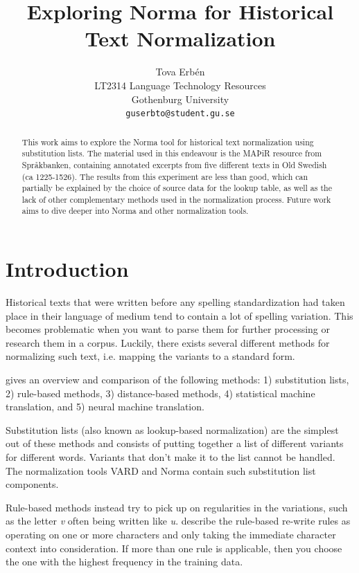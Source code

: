 \documentclass[11pt,a4paper]{article}
\title{Exploring Norma for Historical Text Normalization}
\author{Tova Erbén  \\
  LT2314 Language Technology Resources \\
  Gothenburg University \\
  \texttt{guserbto@student.gu.se} }
\date{}
\begin{document}
\maketitle
\begin{abstract}
This work aims to explore the Norma tool \cite{bollmann:12} for historical text normalization using substitution lists. The material used in this endeavour is the MAÞiR resource from Språkbanken, containing annotated excerpts from five different texts in Old Swedish (ca 1225-1526). The results from this experiment are less than good, which can partially be explained by the choice of source data for the lookup table, as well as the lack of other complementary methods used in the normalization process. Future work aims to dive deeper into Norma and other normalization tools.
\end{abstract}

\section{Introduction}

Historical texts that were written before any spelling standardization had taken place in their language of medium tend to contain a lot of spelling variation. This becomes problematic when you want to parse them for further processing or research them in a corpus. Luckily, there exists several different methods for normalizing such text, i.e. mapping the variants to a standard form.

\citet{bollmann:19} gives an overview and comparison of the following methods: 1) substitution lists, 2) rule-based methods, 3) distance-based methods, 4) statistical machine translation, and 5) neural machine translation. 

Substitution lists (also known as lookup-based normalization) are the simplest out of these methods and consists of putting together a list of different variants for different words. Variants that don't make it to the list cannot be handled. The normalization tools VARD and Norma contain such substitution list components.

Rule-based methods instead try to pick up on regularities in the variations, such as the letter \emph{v} often being written like \emph{u}. \citet{bollmann:12} describe the rule-based re-write rules as operating on one or more characters and only taking the immediate character context into consideration. If more than one rule is applicable, then you choose the one with the highest frequency in the training data.   
\end{document}
